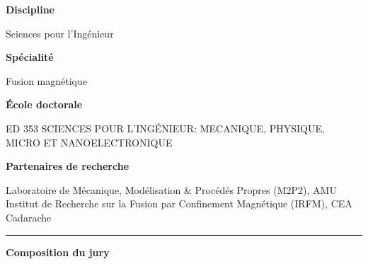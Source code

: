 
\begin{center}
	\begin{minipage}[t]{.37\linewidth}
    	    \vspace{.5em}
        	\textsf{\textbf{Discipline}}
        	
        	\textsf{Sciences pour l'Ingénieur}
        	
    	    \vspace{1em}
        	\textsf{\textbf{Spécialité}}
        	
        	\textsf{Fusion magnétique}
        	
    	    \vspace{2em}
        	\textsf{\textbf{École doctorale}}
        	
        	\textsf{ED 353 SCIENCES POUR L'INGÉNIEUR: MECANIQUE, PHYSIQUE, MICRO ET NANOELECTRONIQUE}
        	
    	    \vspace{1em}
        	\textsf{\textbf{Partenaires de recherche}}
        	
        	\textsf{Laboratoire de Mécanique, Modélisation \& Procédés Propres (M2P2), AMU}
    	    \vspace{0.4em}			        	
        	\textsf{Institut de Recherche sur la Fusion par Confinement Magnétique (IRFM), CEA Cadarache}

	\end{minipage}\hfill
	\begin{minipage}[t]{.02\linewidth}
		\centering
	    \rule[-280pt]{1pt}{280pt}
	\end{minipage}\hfill
	\begin{minipage}[t]{.6\linewidth}
	    \vspace{.5em}
    	\textsf{\textbf{Composition du jury}}


\end{minipage}
\end{center}
